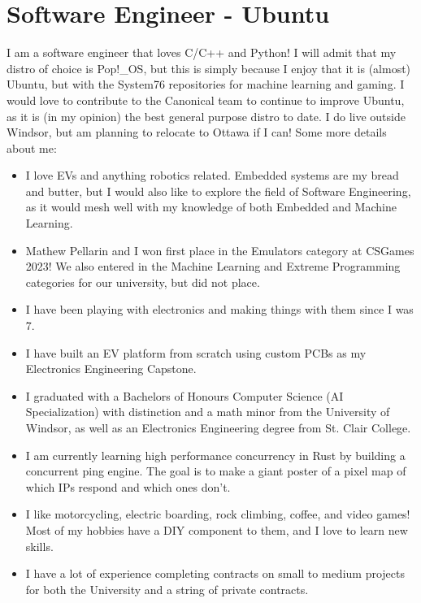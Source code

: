 \section{Software Engineer - Ubuntu}

I am a software engineer that loves C/C++ and Python! I will admit that my distro of choice is Pop!\_OS, but this is simply because I enjoy that it is (almost) Ubuntu, but with the System76 repositories for machine learning and gaming. I would love to contribute to the Canonical team to continue to improve Ubuntu, as it is (in my opinion) the best general purpose distro to date. I do live outside Windsor, but am planning to relocate to Ottawa if I can! Some more details about me:

\begin{itemize}
  \item I love EVs and anything robotics related. Embedded systems are my bread and butter, but I would also like to explore the field of Software Engineering, as it would mesh well with my knowledge of both Embedded and Machine Learning.
  \item Mathew Pellarin and I won first place in the Emulators category at CSGames 2023! We also entered in the Machine Learning and Extreme Programming categories for our university, but did not place.
  \item I have been playing with electronics and making things with them since I was 7.
  \item I have built an EV platform from scratch using custom PCBs as my Electronics Engineering Capstone.
  \item I graduated with a Bachelors of Honours Computer Science (AI Specialization) with distinction and a math minor from the University of Windsor, as well as an Electronics Engineering degree from St. Clair College.
  \item I am currently learning high performance concurrency in Rust by building a concurrent ping engine. The goal is to make a giant poster of a pixel map of which IPs respond and which ones don't.
  \item I like motorcycling, electric boarding, rock climbing, coffee, and video games! Most of my hobbies have a DIY component to them, and I love to learn new skills.
  \item I have a lot of experience completing contracts on small to medium projects for both the University and a string of private contracts.
\end{itemize}
